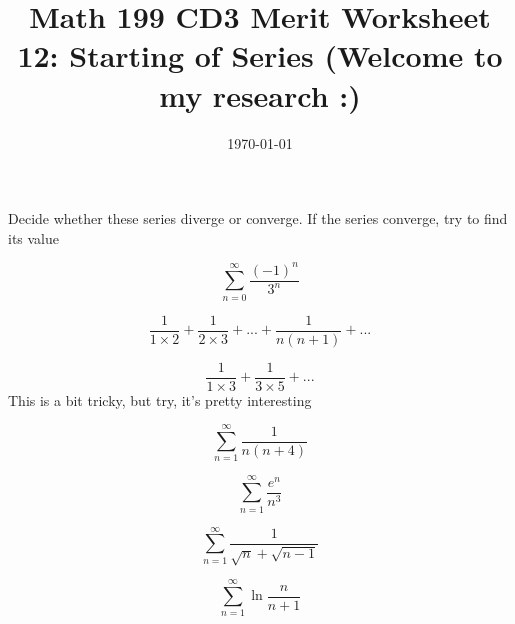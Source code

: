 

\usepackage{fullpage,amsmath,amssymb,amsthm}

\newcommand{\D}{\displaystyle}

\title{Math 199 CD3 Merit Worksheet 12: Starting of Series (Welcome to my research :)}
\date{\today}




\maketitle
Decide whether these series diverge or converge. If the series converge, try to find its value
\be

	\item $$\sum_{n=0}^\infty\frac{(-1)^n}{3^n}$$
	\vfill
	\item $$\frac{1}{1\times2}+\frac{1}{2\times3}+...+\frac{1}{n(n+1)}+...$$
	\vfill
	\item $$\frac{1}{1\times3}+\frac{1}{3\times5}+...$$
	This is a bit tricky, but try, it's pretty interesting 
	\vfill
	\item $$\sum_{n=1}^\infty\frac{1}{n(n+4)}$$\vfill
	\newpage
	\item $$\sum_{n=1}^\infty\frac{e^n}{n^3}$$
	\vfill
	\item $$\sum_{n=1}^\infty\frac{1}{\sqrt{n}+\sqrt{n-1}}$$
	\vfill
	\item $$\sum_{n=1}^\infty\ln\frac{n}{n+1}$$\vfill


\ee

